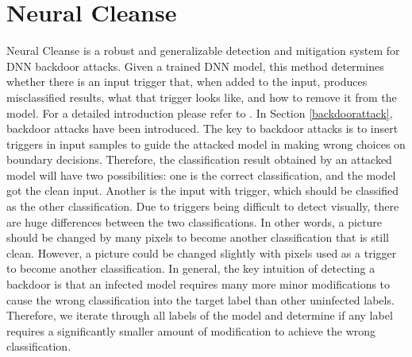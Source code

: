 \documentclass[english,version-2022-01]{uzl-thesis}
\begin{document}
\section{Neural Cleanse}\label{Neural Cleanse} Neural Cleanse is a robust and generalizable detection and mitigation system for DNN backdoor attacks. Given a trained DNN model, this method determines whether there is an input trigger that, when added to the input, produces misclassified results, what that trigger looks like, and how to remove it from the model. For a detailed introduction please refer to \cite{8835365}. In Section \ref{backdoorattack}, backdoor attacks have been introduced. The key to backdoor attacks is to insert triggers in input samples to guide the attacked model in making wrong choices on boundary decisions. Therefore, the classification result obtained by an attacked model will have two possibilities: one is the correct classification, and the model got the clean input. Another is the input with trigger, which should be classified as the other classification. Due to triggers being difficult to detect visually, there are huge differences between the two classifications. In other words, a picture should be changed by many pixels to become another classification that is still clean. However, a picture could be changed slightly with pixels used as a trigger to become another classification. In general, the key intuition of detecting a backdoor is that an infected model requires many more minor modifications to cause the wrong classification into the target label than other uninfected labels. Therefore, we iterate through all labels of the model and determine if any label requires a significantly smaller amount of modification to achieve the wrong classification.
\end{document}
